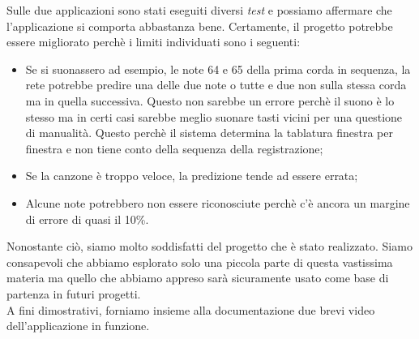 Sulle due applicazioni sono stati eseguiti diversi \textit{test} e possiamo affermare che l'applicazione si comporta abbastanza bene. Certamente, il progetto potrebbe essere migliorato perchè i limiti individuati sono i seguenti:
\begin{itemize}
		\item Se si suonassero ad esempio, le note 64 e 65 della prima corda in sequenza, la rete potrebbe predire una delle due note o tutte e due non sulla stessa corda ma in quella successiva. Questo non sarebbe un errore perchè il suono è lo stesso ma in certi casi sarebbe meglio suonare tasti vicini per una questione di manualità. Questo perchè il sistema determina la tablatura finestra per finestra e non tiene conto della sequenza della registrazione;
		\item Se la canzone è troppo veloce, la predizione tende ad essere errata;
		\item Alcune note potrebbero non essere riconosciute perchè c'è ancora un margine di errore di quasi il 10\%.
	\end{itemize}
Nonostante ciò, siamo molto soddisfatti del progetto che è stato realizzato. Siamo consapevoli che abbiamo esplorato solo una piccola parte di questa vastissima materia ma quello che abbiamo appreso sarà sicuramente usato come base di partenza in futuri progetti.\\
\newline
A fini dimostrativi, forniamo insieme alla documentazione due brevi video dell'applicazione in funzione.